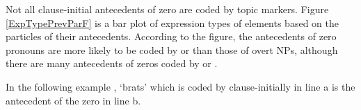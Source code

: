 Not all clause-initial antecedents of zero are coded by topic markers.
Figure \ref{ExpTypePrevParF} is a bar plot of expression types of elements based on the particles of their antecedents.
According to the figure, the antecedents of zero pronouns are more likely to be coded by  or  than
those of overt NPs,
although there are many antecedents of zeros coded by  or .

In the following example \Next,
 `brats' which is coded by  clause-initially in line a is the antecedent of the zero in line b.
